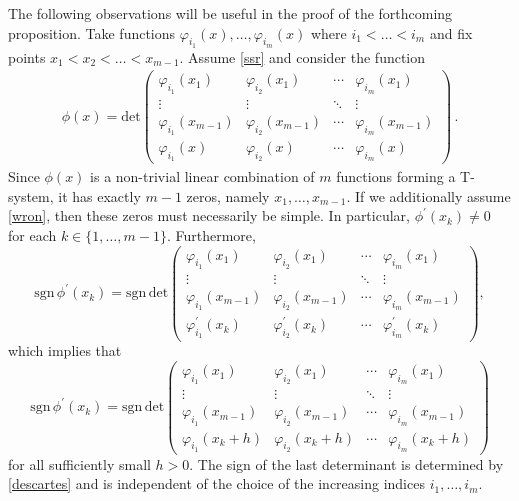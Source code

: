 \documentclass[twoside,a4paper]{amsart}
\newcommand{\sgn}{\mathrm{sgn}}
\renewcommand{\det}{\mathrm{det}}
\theoremstyle{remark}
\begin{document}
The following observations will be useful in the proof of the forthcoming proposition. Take functions \( \varphi_{i_1}(x),\ldots,\varphi_{i_m}(x)\) where $i_1<\ldots<i_m$ and fix points \( x_1<x_2<\ldots<x_{m-1} \). Assume \eqref{ssr} and consider the function
\begin{align}
\label{poly phi}
\phi(x) = \det \begin{pmatrix} \varphi_{i_1}(x_1) & \varphi_{i_2}(x_1) & \cdots & \varphi_{i_m}(x_1) \\ \vdots & \vdots & \ddots & \vdots \\ \varphi_{i_1}(x_{m-1}) & \varphi_{i_2}(x_{m-1}) & \cdots & \varphi_{i_m}(x_{m-1}) \\ \varphi_{i_1}(x) & \varphi_{i_2}(x) & \cdots & \varphi_{i_m}(x) \end{pmatrix}\,. 
\end{align}
Since $\phi(x)$ is a non-trivial  linear combination of \( m \) functions forming a T-system, it
has exactly \( m-1 \) zeros, namely \( x_1,\ldots,x_{m-1} \). If we additionally assume \eqref{wron}, then these zeros must necessarily be simple. In particular, \( \phi^\prime(x_k) \neq 0 \) for each \( k\in\{1,\ldots,m-1 \} \). Furthermore, 
\[
\sgn\, \phi^\prime(x_k) = \sgn \, \det \begin{pmatrix} \varphi_{i_1}(x_1) & \varphi_{i_2}(x_1) & \cdots & \varphi_{i_m}(x_1) \\ \vdots & \vdots & \ddots & \vdots \\ \varphi_{i_1}(x_{m-1}) & \varphi_{i_2}(x_{m-1}) & \cdots & \varphi_{i_m}(x_{m-1}) \\ \varphi_{i_1}^\prime(x_k) & \varphi_{i_2}^\prime(x_k) & \cdots & \varphi_{i_m}^\prime(x_k) \end{pmatrix},
\]
which implies that
\[
\sgn\, \phi^\prime(x_k) = \sgn \, \det \begin{pmatrix} \varphi_{i_1}(x_1) & \varphi_{i_2}(x_1) & \cdots & \varphi_{i_m}(x_1) \\ \vdots & \vdots & \ddots & \vdots \\ \varphi_{i_1}(x_{m-1}) & \varphi_{i_2}(x_{m-1}) & \cdots & \varphi_{i_m}(x_{m-1}) \\ \varphi_{i_1}(x_k+h) & \varphi_{i_2}(x_k+h) & \cdots & \varphi_{i_m}(x_k+h) \end{pmatrix}
\]
for all sufficiently small \( h>0 \). The sign of the last determinant is determined by \eqref{descartes} and is independent of the choice of the increasing indices \( i_1,\ldots,i_m \). 
\end{document}
